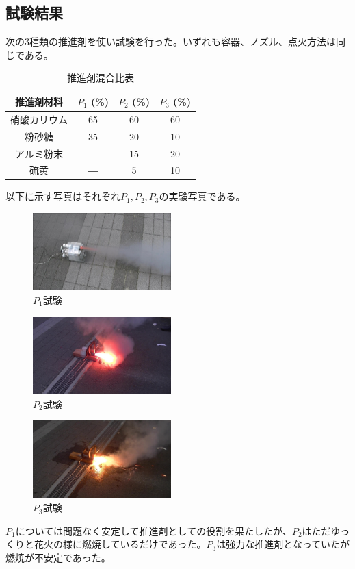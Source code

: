 \subsection{試験結果}
次の3種類の推進剤を使い試験を行った。いずれも容器、ノズル、点火方法は同じである。
\begin{table}[H]
\caption{推進剤混合比表}
\centering
\begin{tabular}{c||c|c|c}
  推進剤材料	&$P_1$ (\%)	&$P_2$ (\%)	&$P_3$ (\%)\\ \hline
硝酸カリウム	&65	&60	&60\\
粉砂糖	&35	&20	&10\\
アルミ粉末	&―	&15	&20\\
硫黄	&―	&5	&10\\ \hline
\end{tabular}
\end{table}
以下に示す写真はそれぞれ$P_1, P_2, P_3$の実験写真である。
\begin{figure}[H]
  \centering
  \includegraphics[height=3cm,clip]{okada/image/p_1.jpg}
  \caption{$P_1$試験}
  \label{fig:p1}
\end{figure}
\begin{figure}[H]
  \centering
  \includegraphics[height=3cm,clip]{okada/image/p_2.jpg}
  \caption{$P_2$試験}
  \label{fig:p2}
\end{figure}
\begin{figure}[H]
  \centering
  \includegraphics[height=3cm,clip]{okada/image/p_3.jpg}
  \caption{$P_3$試験}
  \label{fig:p3}
\end{figure}
$P_1$については問題なく安定して推進剤としての役割を果たしたが、$P_2$はただゆっくりと花火の様に燃焼しているだけであった。$P_3$は強力な推進剤となっていたが燃焼が不安定であった。
